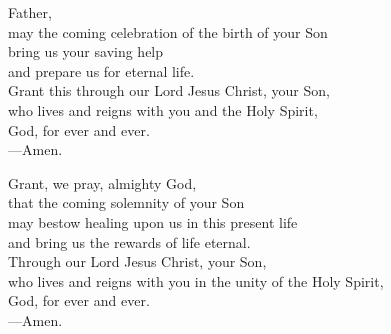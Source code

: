 \prayer


\begin{prayerverse}
Father,\\
may the coming celebration of the birth of your Son\\
bring us your saving help\\
and prepare us for eternal life.\\
Grant this through our Lord Jesus Christ, your Son,\\
who lives and reigns with you and the Holy Spirit,\\
God, for ever and ever.\\
{\color{red}---\thinspace}Amen.
\end{prayerverse}


\begin{prayerverse}
Grant, we pray, almighty God,\\
 that the coming solemnity of your Son\\
may bestow healing upon us in this present life\\
and bring us the rewards of life eternal.\\
Through our Lord Jesus Christ, your Son,\\
 who lives and reigns with you in the unity of the Holy Spirit,\\
God, for ever and ever.\\
{\color{red}---\thinspace}Amen.
\end{prayerverse}

